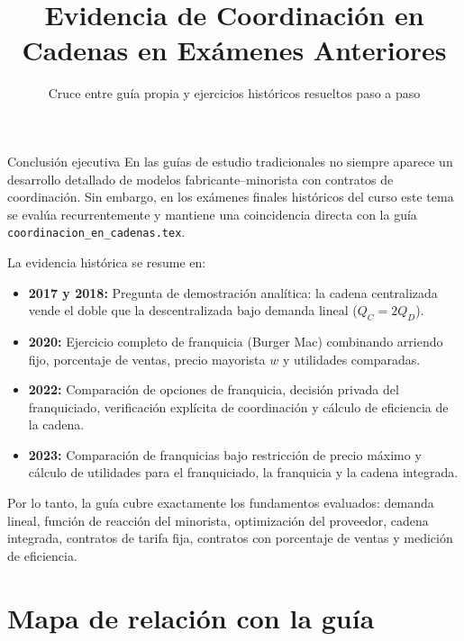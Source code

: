\documentclass[11pt,a4paper]{article}
\title{\textbf{Evidencia de Coordinación en Cadenas en Exámenes Anteriores}}
\author{Cruce entre guía propia y ejercicios históricos resueltos paso a paso}
\date{}
\begin{document}
\maketitle

\begin{analisis}{Conclusión ejecutiva}
En las guías de estudio tradicionales no siempre aparece un desarrollo detallado de modelos fabricante--minorista con contratos de coordinación. Sin embargo, en los exámenes finales históricos del curso este tema se evalúa recurrentemente y mantiene una coincidencia directa con la guía \texttt{coordinacion\_en\_cadenas.tex}.

La evidencia histórica se resume en:
\begin{itemize}[itemsep=2pt]
    \item \textbf{2017 y 2018:} Pregunta de demostración analítica: la cadena centralizada vende el doble que la descentralizada bajo demanda lineal ($Q_C = 2Q_D$).
    \item \textbf{2020:} Ejercicio completo de franquicia (Burger Mac) combinando arriendo fijo, porcentaje de ventas, precio mayorista $w$ y utilidades comparadas.
    \item \textbf{2022:} Comparación de opciones de franquicia, decisión privada del franquiciado, verificación explícita de coordinación y cálculo de eficiencia de la cadena.
    \item \textbf{2023:} Comparación de franquicias bajo restricción de precio máximo y cálculo de utilidades para el franquiciado, la franquicia y la cadena integrada.
\end{itemize}

Por lo tanto, la guía cubre exactamente los fundamentos evaluados: demanda lineal, función de reacción del minorista, optimización del proveedor, cadena integrada, contratos de tarifa fija, contratos con porcentaje de ventas y medición de eficiencia.
\end{analisis}

\section{Mapa de relación con la guía}
\end{document}
